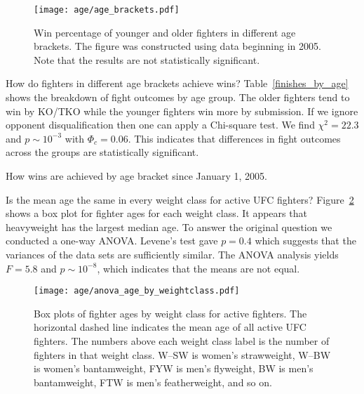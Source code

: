 \begin{figure}[h]
\begin{center}
\texttt{[image: age/age\_brackets.pdf]}
\caption{Win percentage of younger and older fighters
in different age brackets. The figure was constructed
using data beginning in 2005. Note that the results
are not statistically significant.}
\label{age_brackets}
\end{center}
\end{figure}

\clearpage

How do fighters in different age brackets achieve wins?
Table~\ref{finishes_by_age} shows the breakdown of
fight outcomes by age group. The older fighters tend to
win by KO/TKO while the younger fighters win more by
submission. 
If we ignore opponent disqualification then
one can apply a Chi-square test. We find
$\chi^2=22.3$ and $p \sim 10^{-3}$ with $\Phi_c=0.06$. This
indicates that differences in fight outcomes across
the groups are statistically significant.

\begin{center}
\begin{table}[h]

\caption{How wins are achieved by age bracket since January 1, 2005.}
\label{finishes_by_age}
\end{table}
\end{center}

Is the mean age the same in every weight class for active UFC fighters?
Figure~\ref{boxplots_age} shows a box plot for fighter
ages for each weight class. It appears that heavyweight
has the largest median age. To answer the original
question we conducted a one-way ANOVA. Levene's test
gave $p=0.4$ which suggests that the variances of the data
sets are sufficiently similar. The ANOVA analysis yields
$F=5.8$ and $p \sim 10^{-8}$, which indicates that the means
are not equal.

\begin{figure}[h]
\begin{center}
\texttt{[image: age/anova\_age\_by\_weightclass.pdf]}
\caption{Box plots of fighter ages by weight class for active fighters. The horizontal dashed
line indicates the mean age of all active UFC fighters. The
numbers above each weight class label is the number of fighters
in that weight class. W--SW is women's strawweight, W--BW is women's
bantamweight, FYW is men's flyweight, BW is men's bantamweight, FTW
is men's featherweight, and so on.}
\label{boxplots_age}
\end{center}
\end{figure}

